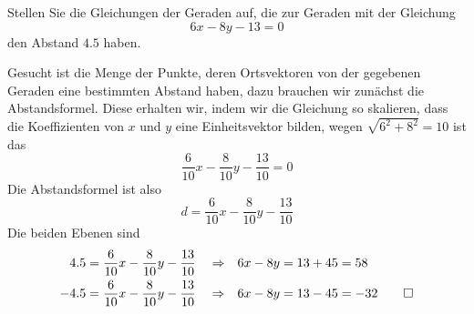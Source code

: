Stellen Sie die Gleichungen der Geraden auf, die zur Geraden mit der
Gleichung
\[
6x-8y-13=0
\]
den Abstand $4.5$ haben.


\begin{loesung}
Gesucht ist die Menge der Punkte, deren Ortsvektoren von der gegebenen
Geraden eine bestimmten Abstand haben, dazu brauchen wir zunächst die
Abstandsformel. Diese erhalten wir, indem wir die Gleichung so skalieren,
dass die Koeffizienten von $x$ und $y$ eine Einheitsvektor bilden,
wegen $\sqrt{6^2+8^2}=10$ ist das
\[
\frac{6}{10}x-\frac{8}{10}y-\frac{13}{10}=0
\]
Die Abstandsformel ist also
\[
d =\frac{6}{10}x-\frac{8}{10}y-\frac{13}{10}
\]
Die beiden Ebenen sind
\begin{align*}
4.5&=\frac{6}{10}x-\frac{8}{10}y-\frac{13}{10}&&\Rightarrow&
6x-8y&=13+45=58
\\
-4.5&=\frac{6}{10}x-\frac{8}{10}y-\frac{13}{10}&&\Rightarrow&
6x-8y&=13-45=-32
\qedhere
\end{align*}
\end{loesung}

